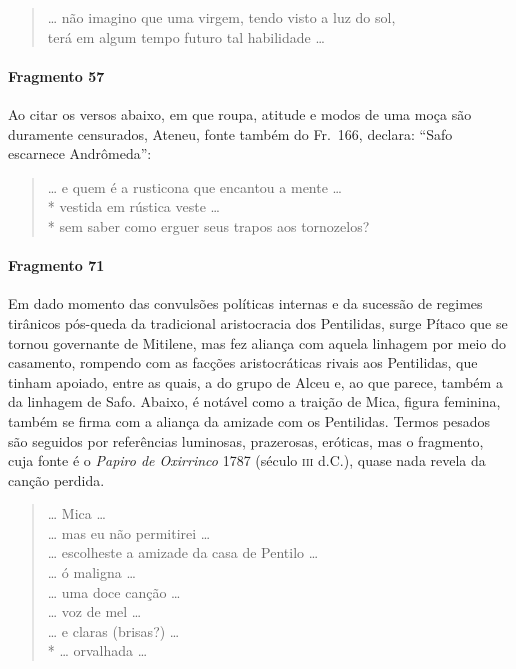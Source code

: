 \begin{verse}
\ldots{} não imagino que uma virgem, tendo visto a \qb{}luz do sol,\\
terá em algum tempo futuro tal habilidade \ldots{}
\end{verse}

\paragraph{Fragmento 57}

{\small Ao citar os versos abaixo, em que roupa, atitude e modos de uma moça são
duramente censurados, Ateneu, fonte também do Fr.~166, declara: ``Safo
escarnece Andrômeda”:}

\begin{verse}
\ldots{} e quem é a rusticona que encantou a \qb{}mente \ldots{}\\*
vestida em rústica veste \ldots{}\\*
sem saber como erguer seus trapos aos \qb{}tornozelos?
\end{verse}

\paragraph{Fragmento 71}

{\small Em dado momento das convulsões políticas internas e da sucessão de regimes
tirânicos pós-queda da tradicional aristocracia dos Pentilidas, surge Pítaco que se tornou governante de
Mitilene, mas fez aliança com aquela linhagem por meio do casamento,
rompendo com as facções aristocráticas rivais aos Pentilidas, que tinham apoiado, entre as quais, a
do grupo de Alceu e, ao que parece, também a da linhagem de Safo. Abaixo, é notável como a traição de 
Mica, figura feminina, também se firma com a aliança da amizade com os Pentilidas. Termos
pesados são seguidos por referências luminosas, prazerosas, eróticas, mas o
fragmento, cuja fonte é o \textit{Papiro de Oxirrinco }1787 (século \textsc{iii} d.C.),
quase nada revela da canção perdida.}

\begin{verse}
\ldots{} Mica \ldots{}\\
\ldots{} mas eu não permitirei \ldots{}\\
\ldots{} escolheste a amizade da casa de Pentilo \ldots{}\\
\ldots{} ó maligna \ldots{}\\
\ldots{} uma doce canção \ldots{}\\
\ldots{} voz de mel \ldots{}\\
\ldots{} e claras (brisas?) \ldots{}\\*
\ldots{} orvalhada \ldots{}
\end{verse}

